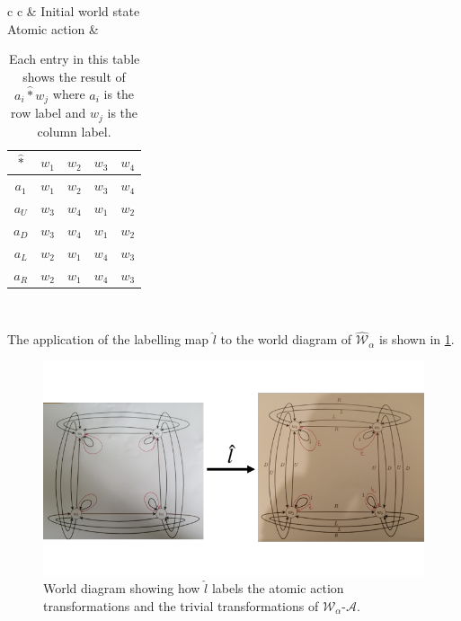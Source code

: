 \begin{table}[H]
    \centering
    \begin{tabular}{c c}
        & Initial world state \\
        Atomic action & \begin{tabular}{c|c c c c}
            $\hat{\ast}$ & $w_{1}$ & $w_{2}$ & $w_{3}$ & $w_{4}$ \\
            \hline
            $a_{1}$ & $w_{1}$ & $w_{2}$ & $w_{3}$ & $w_{4}$ \\
            $a_{U}$ & $w_{3}$ & $w_{4}$ & $w_{1}$ & $w_{2}$ \\
            $a_{D}$ & $w_{3}$ & $w_{4}$ & $w_{1}$ & $w_{2}$ \\
            $a_{L}$ & $w_{2}$ & $w_{1}$ & $w_{4}$ & $w_{3}$ \\
            $a_{R}$ & $w_{2}$ & $w_{1}$ & $w_{4}$ & $w_{3}$ \\
        \end{tabular} \\
    \end{tabular}
    \caption{
    Each entry in this table shows the result of $a_{i} \hat{\ast} w_{j}$ where $a_{i}$ is the row label and $w_{j}$ is the column label.
    }
    \label{tab:2x2_gridworld_atomic_action_effect_operator}
\end{table}

The application of the labelling map $\hat{l}$ to the world diagram of $\hat{\mathscr{W}}_{\alpha}$ is shown in \cref{fig:2x2_cyclical_labelling_with_min_actions}.

\begin{figure}[H]
    \centering
    \includegraphics[width=1\linewidth]{2MathematicalFramework/Images/2x2_cyclical_labelling_with_min_actions.png}
    \caption{
    World diagram showing how $\hat{l}$ labels the atomic action transformations and the trivial transformations of $\mathscr{W}_{\alpha}$-$\mathscr{A}$.
    }
    \label{fig:2x2_cyclical_labelling_with_min_actions}
\end{figure}



